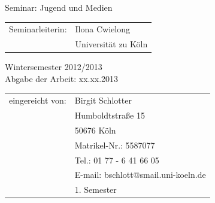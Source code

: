 \begin{titlepage}
\begin{center}

\begin{large}
Seminar: Jugend und Medien\\ [0.8em]
\end{large}


\begin{tabular}{rl}
        Seminarleiterin:  &  Ilona Cwielong\\
       			       &  \small Universität zu Köln \\[0.8em]
\end{tabular}
							  
\begin{large}
Wintersemester 2012/2013\\
Abgabe der Arbeit: xx.xx.2013\\
\end{large}

\vspace{1.7cm}




\begin{tabular}{rl}
        eingereicht von:  &  Birgit Schlotter\\
       			    	  &  Humboldtstraße 15\\
			      		  &  50676 Köln\\
			      		  &  Matrikel-Nr.: 5587077\\
						  &  Tel.: 01 77 - 6 41 66 05\\
						  &  E-mail: bschlott@smail.uni-koeln.de\\
						  &  1. Semester\\[0.8em]
\end{tabular}



%						
							
							
			
							
							
\end{center}

\end{titlepage}

